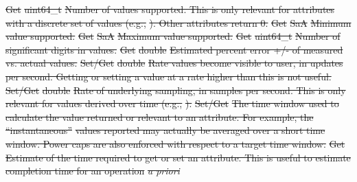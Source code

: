 \documentclass[12pt]{report} %
\providecommand{\DIFdeltex}[1]{{\protect\color{red}\sout{#1}}}                      %
\providecommand{\DIFdel}[1]{\texorpdfstring{\DIFdeltex{#1}}{}} %
\begin{document}
\DIFdel{Get     }%
\DIFdel{uint64_t   }%
\DIFdel{Number of values supported. This is only relevant for attributes with a discrete set of values (e.g., }%
\DIFdel{). Other attributes return 0. }%
\DIFdel{Get     }%
\DIFdel{SaA        }%
\DIFdel{Minimum value supported. }%
\DIFdel{Get     }%
\DIFdel{SaA        }%
\DIFdel{Maximum value supported. }%
\DIFdel{Get     }%
\DIFdel{uint64_t   }%
\DIFdel{Number of significant digits in values. }%
\DIFdel{Get     }%
\DIFdel{double     }%
\DIFdel{Estimated percent error +/- of measured vs. actual values. }%
\DIFdel{Set/Get }%
\DIFdel{double     }%
\DIFdel{Rate values become visible to user, in updates per second. Getting or setting a value at a rate higher than this is not useful. }%
\DIFdel{Set/Get }%
\DIFdel{double     }%
\DIFdel{Rate of underlying sampling, in samples per second. This is only relevant for values derived over time (e.g., }%
\DIFdel{). }%
\DIFdel{Set/Get }%
\DIFdel{The time window used to calculate the value returned or relevant to an attribute. For example, the ``instantaneous'' }%
\DIFdel{values reported may actually be averaged over a short time window. Power caps are also enforced with respect to a target time window. }%
\DIFdel{Get     }%
\DIFdel{Estimate of the time required to get or set an attribute. This is useful to estimate completion time for an operation }\textit{\DIFdel{a priori}}%
\end{document}
